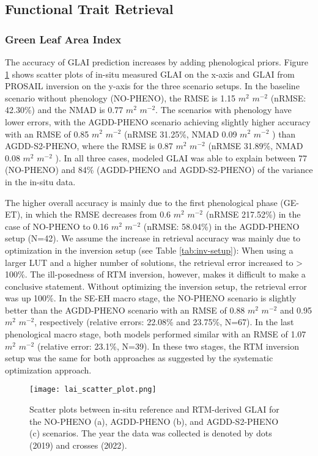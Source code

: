 \subsection{Functional Trait Retrieval}
\label{subsec:res-trait-retrieval}
\subsubsection{Green Leaf Area Index}

The accuracy of GLAI prediction increases by adding phenological priors. Figure \ref{fig:glai-val-scatter} shows scatter plots of in-situ measured GLAI on the x-axis and GLAI from PROSAIL inversion on the y-axis for the three scenario setups. In the baseline scenario without phenology (NO-PHENO), the RMSE is 1.15 $m^2$ $m^{-2}$ (nRMSE: 42.30\%) and the NMAD is 0.77 $m^2$ $m^{-2}$. The scenarios with phenology have lower errors, with the AGDD-PHENO scenario achieving slightly higher accuracy with an RMSE of 0.85 $m^2$ $m^{-2}$  (nRMSE 31.25\%, NMAD 0.09 $m^2$ $m^{-2}$ ) than AGDD-S2-PHENO, where the RMSE is 0.87 $m^2$ $m^{-2}$ (nRMSE 31.89\%, NMAD 0.08 $m^2$ $m^{-2}$ ). In all three cases, modeled GLAI was able to explain between 77 (NO-PHENO) and 84\% (AGDD-PHENO and AGDD-S2-PHENO) of the variance in the in-situ data.

The higher overall accuracy is mainly due to the first phenological phase (GE-ET), in which the RMSE decreases from 0.6 $m^2$ $m^{-2}$ (nRMSE 217.52\%) in the case of NO-PHENO to 0.16 $m^2$ $m^{-2}$ (nRMSE: 58.04\%) in the AGDD-PHENO setup (N=42). We assume the increase in retrieval accuracy was mainly due to optimization in the inversion setup (see Table \ref{tab:inv-setup}): When using a larger LUT and a higher number of solutions, the retrieval error increased to > 100\%. The ill-posedness of RTM inversion, however, makes it difficult to make a conclusive statement. Without optimizing the inversion setup, the retrieval error was up 100\%. In the SE-EH macro stage, the NO-PHENO scenario is slightly better than the AGDD-PHENO scenario with an RMSE of 0.88 $m^2$ $m^{-2}$ and 0.95 $m^2$ $m^{-2}$, respectively (relative errors: 22.08\% and 23.75\%, N=67). In the last phenological macro stage, both models performed similar with an RMSE of 1.07 $m^2$ $m^{-2}$ (relative error: 23.1\%, N=39). In these two stages, the RTM inversion setup was the same for both approaches as suggested by the systematic optimization approach.

\begin{figure}[H]
    \centering
    \texttt{[image: lai\_scatter\_plot.png]}
    \caption[Scatter plots between in-situ reference and RTM-derived GLAI for the NO-PHENO (a), AGDD-PHENO (b), and AGDD-S2-PHENO (c) scenarios. The year the data was collected is denoted by dots (2019) and crosses (2022).]{Scatter plots between in-situ reference and RTM-derived GLAI for the NO-PHENO (a), AGDD-PHENO (b), and AGDD-S2-PHENO (c) scenarios. The year the data was collected is denoted by dots (2019) and crosses (2022).}
    \label{fig:glai-val-scatter}
\end{figure}

